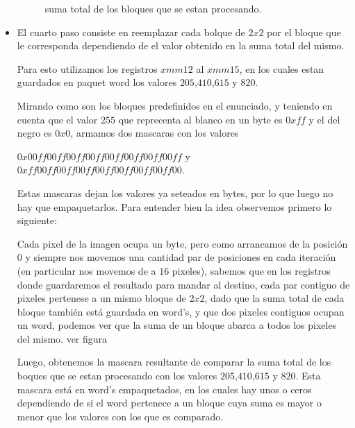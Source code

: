 \begin{itemize}
\begin{figure}[H]

		\caption{suma total de los bloques que se estan procesando.}
		\label{PHADDW}
	\end{figure}

	\item El cuarto paso consiste en reemplazar cada bolque de $2x2$ por el bloque que le corresponda dependiendo de el valor obtenido en la suma total del mismo.

	Para esto utilizamos los registros $xmm12$ al $xmm15$, en los cuales estan guardados en paquet word los valores $205$,$410$,$615$ y $820$.

	Mirando como son los bloques predefinidos en el enunciado, y teniendo en cuenta que el valor $255$ que reprecenta al blanco en un byte es $0xff$ y el del negro es $0x0$, armamos dos mascaras con los valores

	$0x00ff00ff00ff00ff00ff00ff00ff00ff$ y $0xff00ff00ff00ff00ff00ff00ff00ff00$. 

	Estas mascaras dejan los valores ya seteados en bytes, por lo que luego no hay que empaquetarlos.
	Para entender bien la idea observemos primero lo siguiente:

	Cada pixel de la imagen ocupa un byte, pero como arrancamos de la posición $0$ y siempre nos movemos una cantidad par de posiciones en cada iteración (en particular nos movemos de a $16$ pixeles), sabemos que en los registros donde guardaremos el resultado para mandar al destino, cada par contiguo de pixeles pertenese a un mismo bloque de $2x2$, dado que la suma total de cada bloque también está guardada en word's, y que dos pixeles contiguos ocupan un word, podemos ver que la suma de un bloque abarca a todos los pixeles del mismo. ver figura %

	Luego, obtenemos la mascara resultante de comparar la suma total de los boques que se estan procesando con los valores $205$,$410$,$615$ y $820$. Esta mascara está en word's empaquetados, en los cuales hay unos o ceros dependiendo de si el word pertenece a un bloque cuya suma es mayor o menor que los valores con los que es comparado. 


\end{itemize}
